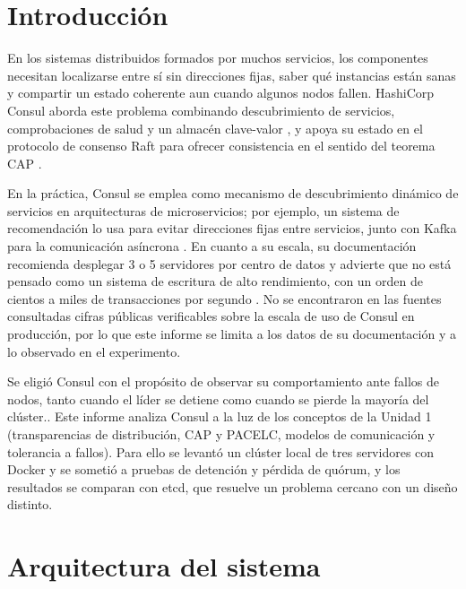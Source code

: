 \documentclass[12pt,a4paper]{article}
\begin{document}
\newpage
\tableofcontents
\newpage

\section{Introducción}

En los sistemas distribuidos formados por muchos servicios, los componentes necesitan
localizarse entre sí sin direcciones fijas, saber qué instancias están sanas y compartir
un estado coherente aun cuando algunos nodos fallen. HashiCorp Consul aborda este problema
combinando descubrimiento de servicios, comprobaciones de salud y un almacén clave-valor
\cite{etcd_why}, y apoya su estado en el protocolo de consenso Raft para ofrecer
consistencia en el sentido del teorema CAP \cite{consul_consensus}.

En la práctica, Consul se emplea como mecanismo de descubrimiento dinámico de servicios en
arquitecturas de microservicios; por ejemplo, un sistema de recomendación lo usa para evitar
direcciones fijas entre servicios, junto con Kafka para la comunicación asíncrona
\cite{rodrigues2025stress}. En cuanto a su escala, su documentación recomienda desplegar 3 o
5 servidores por centro de datos y advierte que no está pensado como un sistema de escritura
de alto rendimiento, con un orden de cientos a miles de transacciones por segundo
\cite{consul_consensus}. No se encontraron en las fuentes consultadas cifras públicas verificables sobre la escala de uso de Consul en producción, por lo que este informe se limita a los datos de su documentación y a lo observado en el experimento.

Se eligió Consul con el propósito de observar su comportamiento ante fallos de nodos, tanto
cuando el líder se detiene como cuando se pierde la mayoría del clúster.. Este informe analiza
Consul a la luz de los conceptos de la Unidad 1 (transparencias de distribución, CAP y PACELC,
modelos de comunicación y tolerancia a fallos). Para ello se levantó un clúster local de tres
servidores con Docker y se sometió a pruebas de detención y pérdida de quórum, y los
resultados se comparan con etcd, que resuelve un problema cercano con un diseño distinto.

\section{Arquitectura del sistema}
\end{document}
